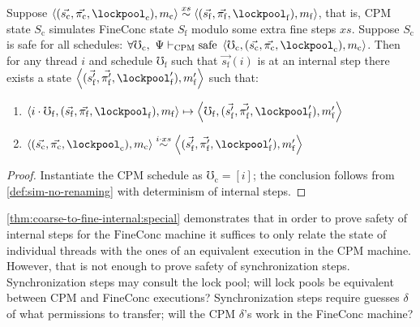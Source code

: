 \begin{lemma}
  \label{thm:coarse-to-fine-internal:special}
  Suppose
  $\left<(\vec{s_\mathrm{c}}, \vec{\pi_\mathrm{c}},
    \lockpool_\mathrm{c}), m_\mathrm{c} \right>
  \stackrel{xs}{\sim} \left<(\vec{s_\mathrm{f}},
  \vec{\pi_\mathrm{f}}, \lockpool_\mathrm{f}), m_\mathrm{f}\right>$,
  that is,
  CPM state $S_\mathrm{c}$ simulates FineConc state $S_\mathrm{f}$
  modulo some extra fine steps $xs$.
   Suppose $S_\mathrm{c}$ is safe for all schedules:\newline
  $\forall \mho_\mathrm{c},~ \Psi \vdash_\mathrm{CPM}
  \mathrm{safe}~\left<\mho_\mathrm{c},(\vec{s_\mathrm{c}},\vec{\pi_\mathrm{c}},\lockpool_\mathrm{c}),m_\mathrm{c}\right>$.
  Then for any thread $i$ and schedule
  $\mho_\mathrm{f}$ such that $\vec{s_\mathrm{f}}(i)$ is at an
  internal step there exists a state
  $\left<(\vec{s'_\mathrm{f}}, \vec{\pi'_\mathrm{f}},
    \lockpool'_\mathrm{f}), m'_\mathrm{f}\right>$
  such that:
  \begin{enumerate}[topsep=0pt]
  \item
    $\left<i\cdot\mho_{\mathrm{f}},(\vec{s_\mathrm{f}},
      \vec{\pi_\mathrm{f}}, \lockpool_\mathrm{f}), m_\mathrm{f}\right>
    \mapsto \left<\mho_{\mathrm{f}},(\vec{s'_\mathrm{f}},
      \vec{\pi'_\mathrm{f}}, \lockpool'_\mathrm{f}),
      m'_\mathrm{f}\right>$
  \item
    $\left<(\vec{s_\mathrm{c}}, \vec{\pi_\mathrm{c}},
      \lockpool_\mathrm{c}), m_\mathrm{c} \right> \stackrel{i \cdot
      xs}{\sim} \left<(\vec{s'_\mathrm{f}},
      \vec{\pi'_\mathrm{f}}, \lockpool'_\mathrm{f}),
      m'_\mathrm{f}\right>$
  \end{enumerate}
\end{lemma}
\begin{proof}
  Instantiate the CPM schedule as  $\mho_\mathrm{c}\!\! = \!\![i]$;
  the conclusion follows from \autoref{def:sim-no-renaming}
  with determinism of internal steps.
\end{proof}

\autoref{thm:coarse-to-fine-internal:special} demonstrates that in order to
prove safety of internal steps for the $\mathrm{FineConc}$ machine it
suffices to only relate the state of individual threads with the ones
of an equivalent execution in the $\mathrm{CPM}$ machine. However,
that is not enough to prove safety of synchronization steps.
Synchronization steps may consult the lock pool;
will lock pools be equivalent between CPM and FineConc executions?
Synchronization steps require guesses $\delta$ of what
permissions to transfer; will the CPM $\delta$'s work in
the FineConc machine?

